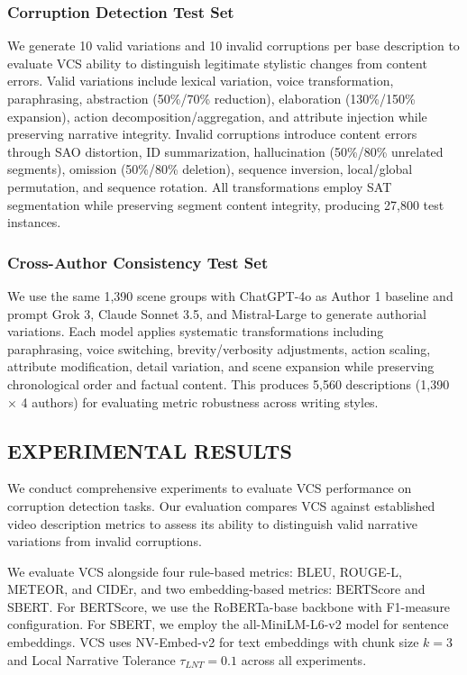 \documentclass[main.tex]{subfiles}
\begin{document}
\subsubsection{Corruption Detection Test Set}
We generate 10 valid variations and 10 invalid corruptions per base description to evaluate VCS ability to distinguish legitimate stylistic changes from content errors. Valid variations include lexical variation, voice transformation, paraphrasing, abstraction (50\%/70\% reduction), elaboration (130\%/150\% expansion), action decomposition/aggregation, and attribute injection while preserving narrative integrity. Invalid corruptions introduce content errors through SAO distortion, ID summarization, hallucination (50\%/80\% unrelated segments), omission (50\%/80\% deletion), sequence inversion, local/global permutation, and sequence rotation. All transformations employ SAT segmentation while preserving segment content integrity, producing 27,800 test instances.

\subsubsection{Cross-Author Consistency Test Set}
We use the same 1,390 scene groups with ChatGPT-4o as Author 1 baseline and prompt Grok 3, Claude Sonnet 3.5, and Mistral-Large to generate authorial variations. Each model applies systematic transformations including paraphrasing, voice switching, brevity/verbosity adjustments, action scaling, attribute modification, detail variation, and scene expansion while preserving chronological order and factual content. This produces 5,560 descriptions (1,390 × 4 authors) for evaluating metric robustness across writing styles.

\subsection{EXPERIMENTAL RESULTS}

We conduct comprehensive experiments to evaluate VCS performance on corruption detection tasks. Our evaluation compares VCS against established video description metrics to assess its ability to distinguish valid narrative variations from invalid corruptions.

We evaluate VCS alongside four rule-based metrics: BLEU, ROUGE-L, METEOR, and CIDEr, and two embedding-based metrics: BERTScore and SBERT. For BERTScore, we use the RoBERTa-base backbone with F1-measure configuration. For SBERT, we employ the all-MiniLM-L6-v2 model for sentence embeddings. VCS uses NV-Embed-v2 for text embeddings with chunk size $k=3$ and Local Narrative Tolerance $\tau_{LNT}=0.1$ across all experiments.
\end{document}
